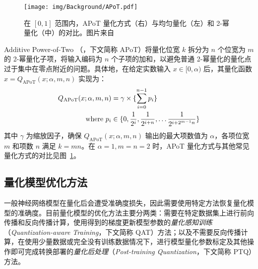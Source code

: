 \documentclass[
  fontset = mac,
]{shtthesis}
\begin{document}
\begin{figure}[htb]
  \centering
  \texttt{[image: img/Background/APoT.pdf]}
  \caption{在 $[0, 1]$ 范围内，APoT 量化方式（右）与均匀量化（左）和 2-幂量化（中）的对比。图片来自 \citet{li2019additive}}
  \label{img::background::apot}
\end{figure}

Additive Power-of-Two （\citet{li2019additive}，下文简称 APoT）将量化位宽 $k$ 拆分为 $n$ 个位宽为 $m$ 的 2-幂量化子项，将输入编码为 $n$ 个子项的加和，以避免普通 2-幂量化的量化点过于集中在零点附近的问题。具体地，在给定实数输入 $x\in [0, \alpha)$ 后，其量化函数 $\hat{x} = Q_{\mathrm{APoT}}(x; \alpha, m, n)$ 实现为：
\begin{align}
  Q_{\mathrm{APoT}}(x; \alpha, m, n) &= \gamma \times \{ \sum_{i=0}^{n-1} p_i \} \\
  \text{where } p_i &\in \{0, \frac{1}{2^i}, \frac{1}{2^{i+n}}, \ldots \frac{1}{2^{i + 2^{m-1}n}}\} \notag
\end{align}
其中 $\gamma$ 为缩放因子，确保 $Q_{\mathrm{APoT}}(x; \alpha, m, n)$ 输出的最大项数值为 $\alpha$，各项位宽 $m$ 和项数 $n$ 满足 $k = mn$。在 $\alpha = 1, m = n = 2$ 时，APoT 量化方式与其他常见量化方式的对比见图~\ref{img::background::apot}。
\subsection{量化模型优化方法}
一般神经网络模型在量化后会遭受准确度损失，因此需要使用特定方法恢复量化模型的准确度。目前量化模型的优化方法主要分两类：需要在特定数据集上进行前向传播和反向传播计算，使用得到的梯度更新模型参数的\emph{量化感知训练}（\emph{Quantization-aware Training}，下文简称 QAT）方法；以及不需要反向传播计算，在使用少量数据或完全没有训练数据情况下，进行模型量化参数标定及其他操作即可完成转换部署的\emph{量化后处理}（\emph{Post-training Quantization}，下文简称 PTQ）方法。
\end{document}
